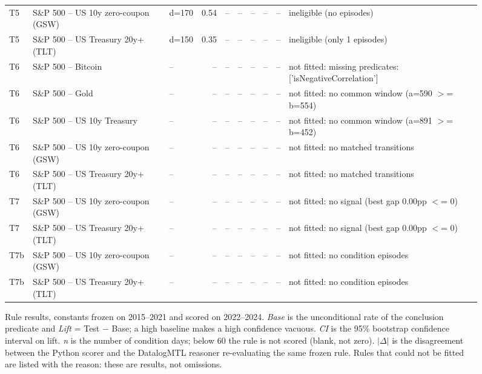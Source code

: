 \begin{figure}
\begin{tabular}{lllrrrrrrl}
T5 & S\&P 500 -- US 10y zero-coupon (GSW) & d=170 & 0.54 & -- & -- & -- & -- & -- & ineligible (no episodes) \\
T5 & S\&P 500 -- US Treasury 20y+ (TLT) & d=150 & 0.35 & -- & -- & -- & -- & -- & ineligible (only 1 episodes) \\
T6 & S\&P 500 -- Bitcoin & -- & -- & -- & -- & -- & -- & -- & not fitted: missing predicates: ['isNegativeCorrelation'] \\
T6 & S\&P 500 -- Gold & -- & -- & -- & -- & -- & -- & -- & not fitted: no common window (a=590 $>$= b=554) \\
T6 & S\&P 500 -- US 10y Treasury & -- & -- & -- & -- & -- & -- & -- & not fitted: no common window (a=891 $>$= b=452) \\
T6 & S\&P 500 -- US 10y zero-coupon (GSW) & -- & -- & -- & -- & -- & -- & -- & not fitted: no matched transitions \\
T6 & S\&P 500 -- US Treasury 20y+ (TLT) & -- & -- & -- & -- & -- & -- & -- & not fitted: no matched transitions \\
T7 & S\&P 500 -- US 10y zero-coupon (GSW) & -- & -- & -- & -- & -- & -- & -- & not fitted: no signal (best gap 0.00pp $<$= 0) \\
T7 & S\&P 500 -- US Treasury 20y+ (TLT) & -- & -- & -- & -- & -- & -- & -- & not fitted: no signal (best gap 0.00pp $<$= 0) \\
T7b & S\&P 500 -- US 10y zero-coupon (GSW) & -- & -- & -- & -- & -- & -- & -- & not fitted: no condition episodes \\
T7b & S\&P 500 -- US Treasury 20y+ (TLT) & -- & -- & -- & -- & -- & -- & -- & not fitted: no condition episodes \\
\bottomrule
\end{tabular}
\caption{Rule results, constants frozen on 2015--2021 and scored on 2022--2024. \emph{Base} is the unconditional rate of the conclusion predicate and \emph{Lift} = Test $-$ Base; a high baseline makes a high confidence vacuous. \emph{CI} is the 95\% bootstrap confidence interval on lift. \emph{n} is the number of condition days; below 60 the rule is not scored (blank, not zero). $|\Delta|$ is the disagreement between the Python scorer and the DatalogMTL reasoner re-evaluating the same frozen rule. Rules that could not be fitted are listed with the reason: these are results, not omissions.}
\label{tab:rule-results}
\end{figure}
